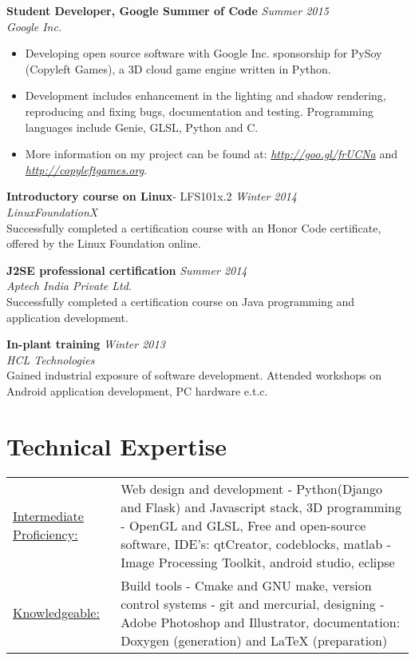 \documentclass[margin]{res}
\begin{document}
\begin{resume}
	{\bf Student Developer, Google Summer of Code} \hfill {\sl Summer 2015}
	\\{\sl Google Inc.}
	\begin{itemize}
	\item Developing open source software with Google Inc. sponsorship for PySoy (Copyleft Games), a 3D cloud game engine written in Python.
 \item Development includes enhancement in the lighting and shadow rendering, reproducing and fixing bugs, documentation and testing. Programming languages include Genie, GLSL, Python and C. 
	\item More information on my project can be found at: {\sl \underline{http://goo.gl/frUCNa}} and {\sl \underline{http://copyleftgames.org}}.
	\end{itemize}
 {\bf Introductory course on Linux}- LFS101x.2 {\sl \hfill Winter 2014}
	\\{\sl LinuxFoundationX}
	\\Successfully completed a certification course with an Honor Code certificate, offered by the Linux Foundation online.
	
	{\bf J2SE professional certification} {\sl \hfill Summer 2014 }
	\\{\sl Aptech India Private Ltd.}
	\\Successfully completed a certification course on Java programming and application development.

 {\bf In-plant training} {\sl \hfill Winter 2013} 
 \\{\sl HCL Technologies}
 \\Gained industrial exposure of software development. Attended workshops on Android application development, PC hardware e.t.c.

\section{Technical Expertise}

\begin{tabular}{l p{3.5in}}
    \underline{Intermediate Proficiency:} & Web design and development - Python(Django and Flask) and Javascript stack, 3D programming - OpenGL and GLSL, Free and open-source software, IDE's: qtCreator, codeblocks, matlab - Image Processing Toolkit, android studio, eclipse\\
		
		\underline{Knowledgeable:} & Build tools - Cmake and GNU make, version control systems - git and mercurial, designing - Adobe Photoshop and Illustrator, documentation: Doxygen (generation) and LaTeX (preparation)
  \end{tabular}
	\\\\

\end{resume}
\end{document}

